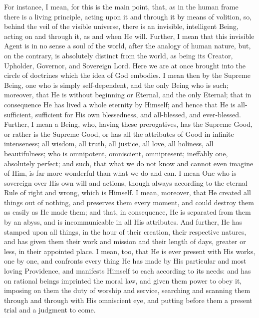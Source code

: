 For instance, I mean, for this is the main point, that, as in the
human frame there is a living principle, acting upon it and through it
by means of volition, so, behind the veil of the visible
universe, there is an invisible, intelligent Being, acting on and
through it, as and when He will. Further, I mean that this invisible
Agent is in no sense a soul of the world, after the analogy of human
nature, but, on the contrary, is absolutely distinct from the world,
as being its Creator, Upholder, Governor, and Sovereign Lord. Here we
are at once brought into the circle of doctrines which the idea of God
embodies. I mean then by the Supreme Being, one who is simply
self-dependent, and the only Being who is such; moreover, that He is
without beginning or Eternal, and the only Eternal; that in
consequence He has lived a whole eternity by Himself; and hence that
He is all-sufficient, sufficient for His own blessedness, and
all-blessed, and ever-blessed. Further, I mean a Being, who, having
these prerogatives, has the Supreme Good, or rather is the Supreme
Good, or has all the attributes of Good in infinite intenseness; all
wisdom, all truth, all justice, all love, all holiness, all
beautifulness; who is omnipotent, omniscient, omnipresent; ineffably
one, absolutely perfect; and such, that what we do not know and cannot
even imagine of Him, is far more wonderful than what we do and can. I
mean One who is sovereign over His own will and actions, though always
according to the eternal Rule of right and wrong, which is Himself. I
mean, moreover, that He created all things out of nothing, and
preserves them every moment, and could destroy them as easily as He
made them; and that, in consequence, He is separated from them by an
abyss, and is incommunicable in all His attributes. And further, He
has stamped upon all things, in the hour of their creation, their
respective natures, and has given them their work and mission and
their length of days, greater or less, in their appointed place. I
mean, too, that He is ever present with His works, one by one,
and confronts every thing He has made by His particular and most
loving Providence, and manifests Himself to each according to its
needs: and has on rational beings imprinted the moral law, and given
them power to obey it, imposing on them the duty of worship and
service, searching and scanning them through and through with His
omniscient eye, and putting before them a present trial and a judgment
to come.

